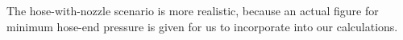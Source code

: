 The hose-with-nozzle scenario is more realistic, because an actual figure for minimum hose-end pressure is given for us to incorporate into our calculations.  










